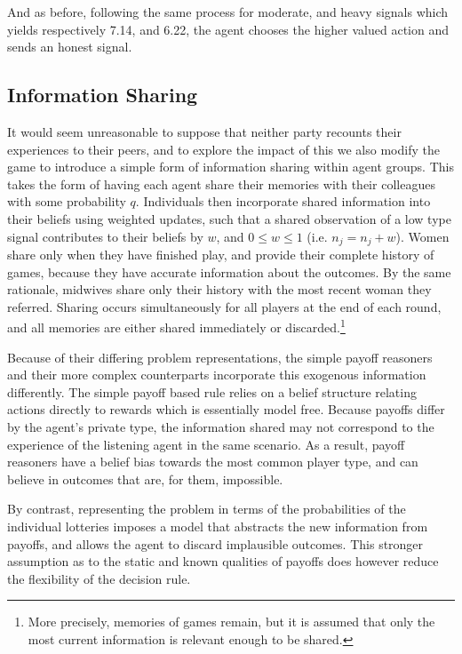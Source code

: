 And as before, following the same process for moderate, and heavy signals which yields respectively 7.14, and 6.22, the agent chooses the higher valued action and sends an honest signal.


\subsection{Information Sharing}
\label{sub:info_sharing}

It would seem unreasonable to suppose that neither party recounts their experiences to their peers, and to explore the impact of this we also modify the game to introduce a simple form of information sharing within agent groups. This takes the form of having each agent share their memories with their colleagues with some probability \(q\). Individuals then incorporate shared information into their beliefs using weighted updates, such that a shared observation of a low type signal contributes to their beliefs by \(w\), and \(0\leq w\leq 1\) (i.e. \(n_{j} = n_{j} + w\)).
Women share only when they have finished play, and provide their complete history of games, because they have accurate information about the outcomes. By the same rationale, midwives share only their history with the most recent woman they referred. Sharing occurs simultaneously for all players at the end of each round, and all memories are either shared immediately or discarded.\footnote{More precisely, memories of games remain, but it is assumed that only the most current information is relevant enough to be shared.}

Because of their differing problem representations, the simple payoff reasoners and their more complex counterparts incorporate this exogenous information differently. The simple payoff based rule relies on a belief structure relating actions directly to rewards which is essentially model free. Because payoffs differ by the agent's private type, the information shared may not correspond to the experience of the listening agent in the same scenario. As a result, payoff reasoners have a belief bias towards the most common player type, and can believe in outcomes that are, for them, impossible.

By contrast, representing the problem in terms of the probabilities of the individual lotteries imposes a model that abstracts the new information from payoffs, and allows the agent to discard implausible outcomes. This stronger assumption as to the static and known qualities of payoffs does however reduce the flexibility of the decision rule.